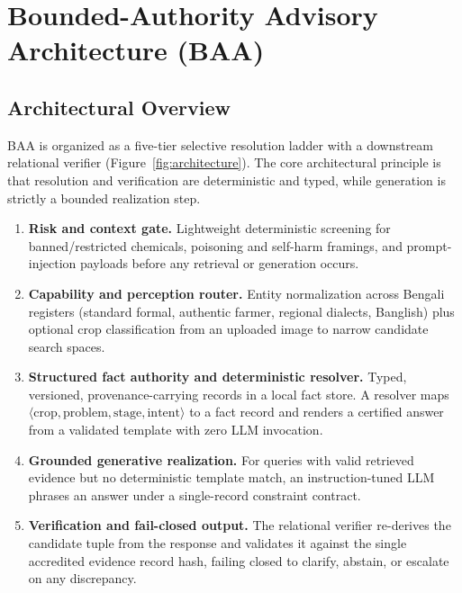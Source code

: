
\section{Bounded-Authority Advisory Architecture (BAA)}
\label{sec:system_architecture}

\subsection{Architectural Overview}
BAA is organized as a five-tier selective resolution ladder with a downstream relational verifier (Figure~\ref{fig:architecture}). The core architectural principle is that resolution and verification are deterministic and typed, while generation is strictly a bounded realization step.

\begin{enumerate}
    \item[\textbf{Tier~0}] \textbf{Risk and context gate.} Lightweight deterministic screening for banned/restricted chemicals, poisoning and self-harm framings, and prompt-injection payloads before any retrieval or generation occurs.
    \item[\textbf{Tier~1}] \textbf{Capability and perception router.} Entity normalization across Bengali registers (standard formal, authentic farmer, regional dialects, Banglish) plus optional crop classification from an uploaded image to narrow candidate search spaces.
    \item[\textbf{Tier~2}] \textbf{Structured fact authority and deterministic resolver.} Typed, versioned, provenance-carrying records in a local fact store. A resolver maps $\langle\text{crop}, \text{problem}, \text{stage}, \text{intent}\rangle$ to a fact record and renders a certified answer from a validated template with zero LLM invocation.
    \item[\textbf{Tier~3}] \textbf{Grounded generative realization.} For queries with valid retrieved evidence but no deterministic template match, an instruction-tuned LLM phrases an answer under a single-record constraint contract.
    \item[\textbf{Tier~4}] \textbf{Verification and fail-closed output.} The relational verifier re-derives the candidate tuple from the response and validates it against the single accredited evidence record hash, failing closed to clarify, abstain, or escalate on any discrepancy.
\end{enumerate}

